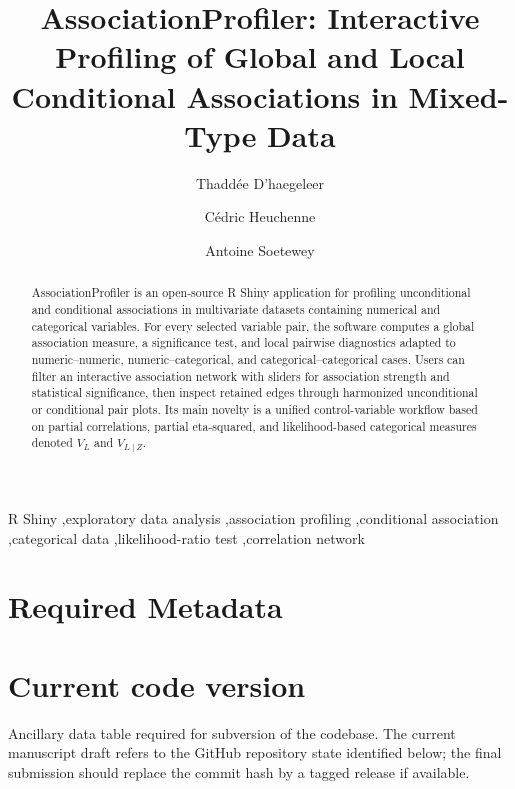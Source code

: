 \documentclass[preprint,12pt,a4paper]{elsarticle}
\begin{document}
\renewcommand{\labelenumii}{\arabic{enumi}.\arabic{enumii}}

\begin{frontmatter}

\title{AssociationProfiler: Interactive Profiling of Global and Local Conditional Associations in Mixed-Type Data}

\author[aff1]{Thadd\'ee D'haegeleer}
\author[aff1,aff2]{C\'edric Heuchenne}
\author[aff1,aff2]{Antoine Soetewey}
\address[aff1]{TODO: affiliation}
\address[aff2]{TODO: affiliation}

\begin{abstract}
AssociationProfiler is an open-source R Shiny application for profiling unconditional and conditional associations in multivariate datasets containing numerical and categorical variables. For every selected variable pair, the software computes a global association measure, a significance test, and local pairwise diagnostics adapted to numeric--numeric, numeric--categorical, and categorical--categorical cases. Users can filter an interactive association network with sliders for association strength and statistical significance, then inspect retained edges through harmonized unconditional or conditional pair plots. Its main novelty is a unified control-variable workflow based on partial correlations, partial eta-squared, and likelihood-based categorical measures denoted $V_L$ and $V_{L\mid Z}$.
\end{abstract}

\begin{keyword}
R Shiny \sep exploratory data analysis \sep association profiling \sep conditional association \sep categorical data \sep likelihood-ratio test \sep correlation network
\end{keyword}

\end{frontmatter}

\section*{Required Metadata}

\section*{Current code version}

Ancillary data table required for subversion of the codebase. The current manuscript draft refers to the GitHub repository state identified below; the final submission should replace the commit hash by a tagged release if available.
\end{document}
